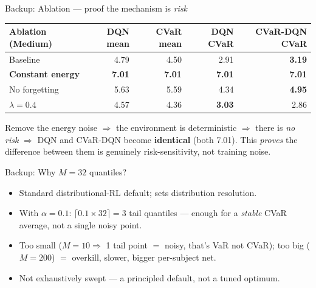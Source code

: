 \documentclass[aspectratio=169,11pt]{beamer}
\newcommand{\hl}[1]{{\color{accent}\textbf{#1}}}
\newcommand{\bad}[1]{{\color{accent2}\textbf{#1}}}
\begin{document}
\appendix
{

\begin{frame}{Backup: Ablation --- proof the mechanism is \emph{risk}}
  \begin{center}\small
  \begin{tabular}{lrrrr}
    \toprule
    Ablation (Medium) & DQN mean & CVaR mean & DQN CVaR & CVaR-DQN CVaR\\
    \midrule
    Baseline         & 4.79 & 4.50 & 2.91 & \bad{3.19}\\
    \textbf{Constant energy} & \textbf{7.01} & \textbf{7.01} & \textbf{7.01} & \textbf{7.01}\\
    No forgetting    & 5.63 & 5.59 & 4.34 & \bad{4.95}\\
    $\lambda{=}0.4$  & 4.57 & 4.36 & \textbf{3.03} & 2.86\\
    \bottomrule
  \end{tabular}
  \end{center}
  \vspace{0.5em}
  Remove the energy noise $\Rightarrow$ the environment is deterministic
  $\Rightarrow$ there is \emph{no risk} $\Rightarrow$ DQN and CVaR-DQN become
  \hl{identical} (both 7.01). This \emph{proves} the difference between them
  is genuinely risk-sensitivity, not training noise.
\end{frame}

\begin{frame}{Backup: Why $M=32$ quantiles?}
  \begin{itemize}
    \item Standard distributional-RL default; sets distribution resolution.
    \item With $\alpha{=}0.1$: $\lceil 0.1{\times}32\rceil = 3$ tail quantiles
          --- enough for a \emph{stable} CVaR average, not a single noisy point.
    \item Too small ($M{=}10\Rightarrow$ 1 tail point $=$ noisy, that's VaR not CVaR);
          too big ($M{=}200$) $=$ overkill, slower, bigger per-subject net.
    \item Not exhaustively swept --- a principled default, not a tuned optimum.
  \end{itemize}
\end{frame}

}
\end{document}
